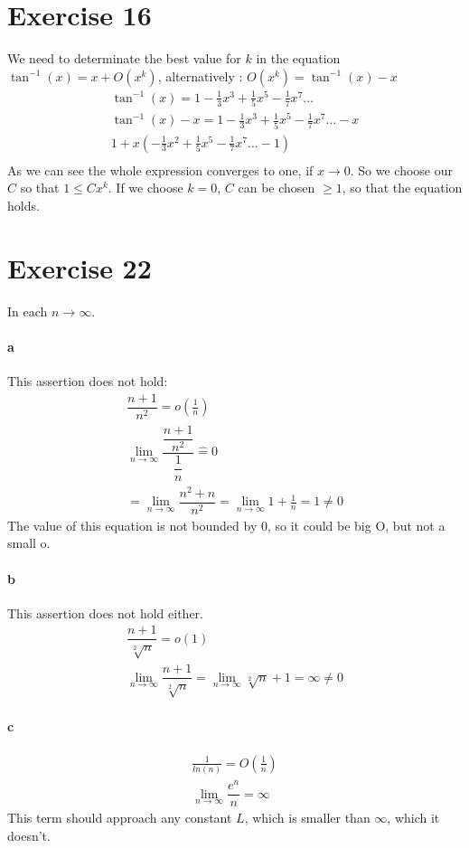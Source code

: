 \section{Exercise 16}
We need to determinate the best value for $k$ in the equation $\tan^{-1}(x) = x+ O(x^k)$, alternatively : $ O(x^k) = \tan^{-1}(x) -x$
\begin{gather*}
\tan^{-1}(x) = 1 - \frac{1}{3} x^3 + \frac{1}{5} x^5 - \frac{1}{7} x^7 \ldots \\
\tan^{-1}(x) -x = 1 - \frac{1}{3} x^3 + \frac{1}{5} x^5 - \frac{1}{7} x^7 \ldots -x \\
1 + x \left( -\frac{1}{3} x^2 + \frac{1}{5} x^5 - \frac{1}{7} x^7 \ldots - 1  \right) \\
\end{gather*}
As we can see the whole expression converges to one, if $x \to 0$. So we choose our $C$ so that $ 1 \leq C x^k $. If we choose $k = 0$, $C$ can be chosen $\geq 1$, so that the equation holds.
\section{Exercise 22}
In each $n \to \infty$.
\paragraph{a}
This assertion does not hold:
\begin{gather*}
\dfrac{n+1}{n^2} = o(\frac{1}{n}) \\
\lim_{n \to \infty} \dfrac{\dfrac{n+1}{n^2}}{\dfrac{1}{n}} \hat{=} 0 \\
= \lim_{n \to \infty} \dfrac{n^2 + n}{n^2} = \lim_{n \to \infty} 1+\frac{1}{n} = 1 \neq 0
\end{gather*}
The value of this equation is not bounded by 0, so it could be big O, but not a small o.
\paragraph{b}
This assertion does not hold either.
\begin{gather*}
\dfrac{n+1}{\sqrt[2]{n}} = o(1) \\
\lim_{n \to \infty} \dfrac{n+1}{\sqrt[2]{n}} = \lim_{n \to \infty} \sqrt[2]{n} + 1 = \infty \neq 0
\end{gather*}
\paragraph{c}
\begin{gather*}
\frac{1}{ln(n)} = O (\frac{1}{n}) \\
\lim_{n \to \infty} \dfrac{e^n}{n}  = \infty 
\end{gather*}
This term should approach any constant $L$, which is smaller than $\infty$, which it doesn't.

